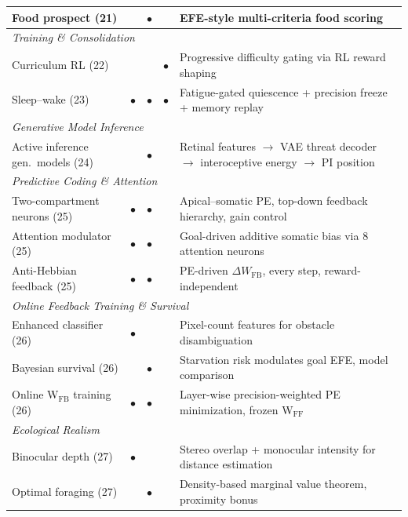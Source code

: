 \documentclass[11pt,a4paper]{article}
\begin{document}
\begin{table}[H]
\begin{tabular}{lcccp{5.8cm}}
Food prospect (21)             &           & $\bullet$ &           & EFE-style multi-criteria food scoring \\
\midrule
\multicolumn{5}{l}{\textit{Training \& Consolidation}} \\
Curriculum RL (22)             &           &           & $\bullet$ & Progressive difficulty gating via RL reward shaping \\
Sleep--wake (23)               & $\bullet$ & $\bullet$ & $\bullet$ & Fatigue-gated quiescence + precision freeze + memory replay \\
\midrule
\multicolumn{5}{l}{\textit{Generative Model Inference}} \\
Active inference gen.\ models (24) &           & $\bullet$ &           & Retinal features $\to$ VAE threat decoder $\to$ interoceptive energy $\to$ PI position \\
\midrule
\multicolumn{5}{l}{\textit{Predictive Coding \& Attention}} \\
Two-compartment neurons (25)       & $\bullet$ & $\bullet$ &           & Apical--somatic PE, top-down feedback hierarchy, gain control \\
Attention modulator (25)           & $\bullet$ & $\bullet$ &           & Goal-driven additive somatic bias via 8 attention neurons \\
Anti-Hebbian feedback (25)         & $\bullet$ & $\bullet$ &           & PE-driven $\Delta W_\text{FB}$, every step, reward-independent \\
\midrule
\multicolumn{5}{l}{\textit{Online Feedback Training \& Survival}} \\
Enhanced classifier (26)           & $\bullet$ &           &           & Pixel-count features for obstacle disambiguation \\
Bayesian survival (26)             &           & $\bullet$ &           & Starvation risk modulates goal EFE, model comparison \\
Online W$_\text{FB}$ training (26) & $\bullet$ & $\bullet$ &           & Layer-wise precision-weighted PE minimization, frozen W$_\text{FF}$ \\
\midrule
\multicolumn{5}{l}{\textit{Ecological Realism}} \\
Binocular depth (27)              & $\bullet$ &           &           & Stereo overlap + monocular intensity for distance estimation \\
Optimal foraging (27)             &           & $\bullet$ &           & Density-based marginal value theorem, proximity bonus \\

\end{tabular}
\end{table}
\end{document}
